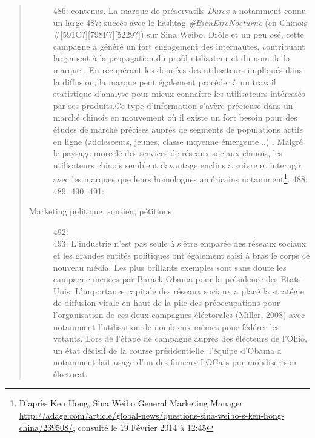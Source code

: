 \begin{quote}
\begin{description}
486: contenus. La marque de pr\'eservatifs \textit{Durex} a notamment connu un large
487: succ\`es avec le hashtag \textit{\#BienEtreNocturne} (en Chinois \#[591C?][798F?][5229?]) sur Sina Weibo. Dr\^ole et un peu os\'e, cette campagne a g\'en\'er\'e un fort engagement des internautes, contribuant largement \`a la propagation du profil utilisateur et du nom de la marque \cite{Shi2011}. En r\'ecup\'erant les donn\'ees des utilisateurs impliqu\'es dans la diffusion, la marque peut \'egalement proc\'eder \`a un travail statistique d{\textquoteright}analyse pour mieux conna\^itre les utilisateurs int\'eress\'es par ses produits.Ce type d{\textquoteright}information s{\textquoteright}av\`ere pr\'ecieuse dans un march\'e chinois en mouvement o\`u il existe un fort besoin pour des \'etudes de march\'e pr\'ecises aupr\`es de segments de populations actifs en ligne (adolescents, jeunes, classe moyenne \'emergente...) \cite{Bergstrom2012}. Malgr\'e le paysage morcel\'e des services de r\'eseaux sociaux chinois, les utilisateurs chinois semblent davantage enclins \`a suivre et interagir avec les marques que leurs homologues am\'ericains notamment\footnote{ D{\textquoteright}apr\`es Ken Hong, Sina Weibo General Marketing Manager  \url{http://adage.com/article/global-news/questions-sina-weibo-s-ken-hong-china/239508/,} consult\'e le 19 F\'evrier 2014 \`a 12:45}. 
488: 
489: 
490: 
491: \item[Marketing politique, soutien, p\'etitions]
492: \hfill \\
493: L{\textquoteright}industrie n{\textquoteright}est pas seule \`a s{\textquoteright}\^etre empar\'ee des r\'eseaux sociaux et les grandes entit\'es politiques ont \'egalement saisi \`a bras le corps ce nouveau m\'edia. Les plus brillants exemples sont sans doute les campagne men\'ees par Barack Obama pour la pr\'esidence des Etats-Unis. L{\textquoteright}importance capitale des r\'eseaux sociaux a plac\'e la strat\'egie de diffusion virale en haut de la pile des pr\'eoccupations pour l{\textquoteright}organisation de ces deux campagnes \'el\'ectorales (Miller, 2008) avec notamment l{\textquoteright}utilisation de nombreux m\`emes pour f\'ed\'erer les votants. Lors de l{\textquoteright}\'etape de campagne aupr\`es des \'electeurs de l{\textquoteright}Ohio, un \'etat d\'ecisif de la course pr\'esidentielle, l{\textquoteright}\'equipe d{\textquoteright}Obama a notamment fait usage d{\textquoteright}un des fameux LOCats pur mobiliser son \'electorat. 

\end{description}
\end{quote}
